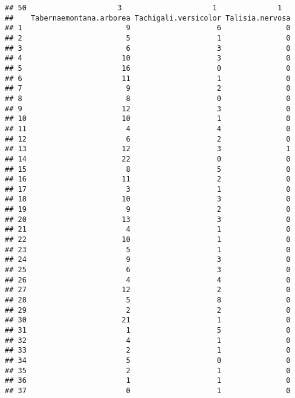 \documentclass[
]{article}
\begin{document}
\begin{verbatim}
## 50                     3                     1              1
##    Tabernaemontana.arborea Tachigali.versicolor Talisia.nervosa
## 1                        9                    6               0
## 2                        5                    1               0
## 3                        6                    3               0
## 4                       10                    3               0
## 5                       16                    0               0
## 6                       11                    1               0
## 7                        9                    2               0
## 8                        8                    0               0
## 9                       12                    3               0
## 10                      10                    1               0
## 11                       4                    4               0
## 12                       6                    2               0
## 13                      12                    3               1
## 14                      22                    0               0
## 15                       8                    5               0
## 16                      11                    2               0
## 17                       3                    1               0
## 18                      10                    3               0
## 19                       9                    2               0
## 20                      13                    3               0
## 21                       4                    1               0
## 22                      10                    1               0
## 23                       5                    1               0
## 24                       9                    3               0
## 25                       6                    3               0
## 26                       4                    4               0
## 27                      12                    2               0
## 28                       5                    8               0
## 29                       2                    2               0
## 30                      21                    1               0
## 31                       1                    5               0
## 32                       4                    1               0
## 33                       2                    1               0
## 34                       5                    0               0
## 35                       2                    1               0
## 36                       1                    1               0
## 37                       0                    1               0

\end{verbatim}
\end{document}
